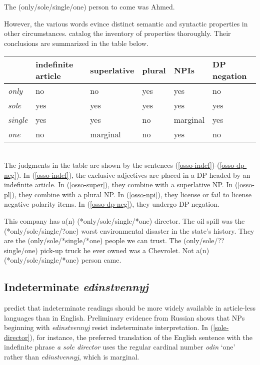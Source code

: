 \documentclass{article}
\begin{document}
\begin{exe}
	\ex \label{osso} The (only/sole/single/one) person to come was Ahmed.
\end{exe}

However, the various words evince distinct semantic and syntactic properties in other circumstances. \citet{cb2012b} catalog the inventory of properties thoroughly. Their conclusions are summarized in the table below.\\

\begin{tabular}{ l | l l l l l }
	& indefinite article & superlative & plural & NPIs & DP negation \\
	\hline
	\textit{only} & no & no & yes & yes & no \\
	\textit{sole} & yes & yes & yes & yes & yes \\
	\textit{single} & yes & yes & no & marginal & yes \\
	\textit{one} & no & marginal & no & yes & no \\
\end{tabular}

\ \\

The judgments in the table are shown by the sentences (\ref{osso-indef})-(\ref{osso-dp-neg}). In (\ref{osso-indef}), the exclusive adjectives are placed in a DP headed by an indefinite article. In (\ref{osso-super}), they combine with a superlative NP. In (\ref{osso-pl}), they combine with a plural NP. In (\ref{osso-npi}), they license or fail to license negative polarity items. In (\ref{osso-dp-neg}), they undergo DP negation.

\begin{exe}
	\ex \label{osso-indef} This company has a(n) (*only/sole/single/*one) director.
	\ex \label{osso-super} The oil spill was the (*only/sole/single/?one) worst environmental disaster in the state's history.
	\ex \label{osso-pl} They are the (only/sole/*single/*one) people we can trust.
	\ex \label{osso-npi} The (only/sole/??single/one) pick-up truck he ever owned was a Chevrolet.
	\ex \label{osso-dp-neg} Not a(n) (*only/sole/single/*one) person came.
\end{exe}

\subsection{Indeterminate \textit{edinstvennyj}}
\citet{cb2015} predict that indeterminate readings should be more widely available in article-less languages than in English. Preliminary evidence from Russian shows that NPs beginning with \textit{edinstvennyj} resist indeterminate interpretation. In (\ref{sole-director}), for instance, the preferred translation of the English sentence with the indefinite phrase \textit{a sole director} uses the regular cardinal number \textit{odin} `one' rather than \textit{edinstvennyj}, which is marginal.
\end{document}
